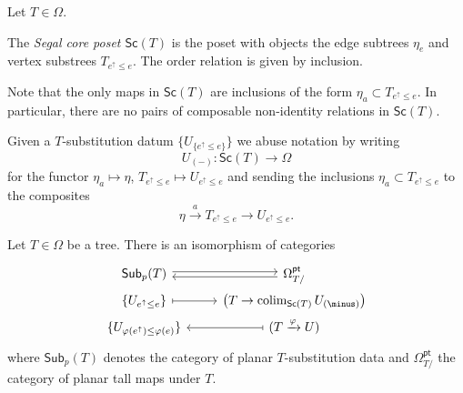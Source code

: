 \documentclass[a4paper,10pt]{article}%
\begin{document}
\begin{definition}
	Let $T \in \Omega$. 
	
	The \textit{Segal core poset $\mathsf{Sc}(T)$} is the poset with objects the edge subtrees $\eta_e$ and vertex substrees $T_{e^{\uparrow} \leq e}$. The order relation is given by inclusion.
\end{definition}

\begin{remark}
Note that the only maps in $\mathsf{Sc}(T)$ are inclusions of the form $\eta_a \subset T_{e^{\uparrow}\leq e}$.
In particular, there are no pairs of composable non-identity relations in $\mathsf{Sc}(T)$. 
\end{remark}

Given a $T$-substitution datum $\{U_{\{e^{\uparrow}\leq e\}}\}$ we abuse notation by writing
\[U_{(\minus)} \colon \mathsf{Sc}(T) \to \Omega\]
for the functor $\eta_a \mapsto \eta$, $T_{e^{\uparrow} \leq e} \mapsto U_{e^{\uparrow} \leq e}$  
and sending the inclusions $\eta_a \subset T_{e^{\uparrow} \leq e}$
to the composites
\[
\eta \xrightarrow{a} T_{e^{\uparrow} \leq e}  \to 
U_{e^{\uparrow} \leq e}.\]


\begin{proposition}\label{SUBDATAUNDERPLAN PROP}
Let $T \in \Omega$ be a tree. There is an isomorphism of categories
\begin{equation}\label{SUBDATAUNDERPLAN EQ}
\begin{tikzcd}[row sep =0pt]
	\mathsf{Sub}_p(T) \ar[r,shift left=2pt] &
	\Omega_{T/}^{\mathsf{pt}} \ar[l,shift left=2pt]
\\
	\{U_{e^{\uparrow} \leq e}\} \ar[r,mapsto] & 
	\left(T \to \colim_{\mathsf{Sc}(T)} U_{(\minus)}\right)
\\
	\{U_{\varphi(e^{\uparrow}) \leq \varphi(e)}\} &
	(T \xrightarrow{\varphi} U) \ar[l,mapsto]
\end{tikzcd}
\end{equation}
where $\mathsf{Sub}_p(T)$ denotes the category of planar $T$-substitution data and $\Omega_{T/}^{\mathsf{pt}}$
the category of planar tall maps under $T$. 
\end{proposition}
\end{document}
